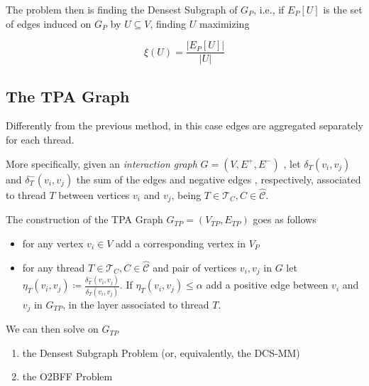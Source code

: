 


The problem then is finding the Densest Subgraph of $G_P$, i.e., if $E_{P} [U]$
is the set of edges induced on $G_P$ by $U \subseteq V$, finding $U$ maximizing

\begin{equation}
	\xi(U) = \frac{|E_{P} [U]|}{|U|}
\end{equation}

\subsection{The \acrlong{TPA} Graph}%
\label{ssub:the_tpa_graph}

Differently from the previous method, in this case edges are aggregated
separately for each thread.

\bigskip

More specifically, given an \emph{interaction graph} $G = (V, E^{+}, E^{-})$ ,
let $\delta_{T}(v_{i}, v_{j})$ and
$\delta^{-} _{T}(v_{i}, v_{j})$ the sum of the edges and negative edges , respectively,
associated to thread $T$ between vertices $v_{i} $ and $v_{j} $, being $T \in
	\mathcal{T}_{C}, C \in \mathcal{\hat{C}}$.

The construction of the \acrfull{TPA} Graph $G_{TP} = (V_{TP}, E_{TP})$ goes as follows

\begin{itemize}
	\item for any vertex $v_{i} \in V$ add a corresponding vertex in $V_{P} $
	\item for any thread $T \in
		      \mathcal{T}_{C}, C \in \mathcal{\hat{C}}$ and pair of vertices
	      $v_i, v_j$ in $G$ let $\eta_{T}(v_i,v_j)
		      \coloneqq \frac{\delta^{-} _{T}(v_i,v_j)}{\delta _{T}(v_i,v_j)} $. If
	      $\eta_{T}(v_i,v_j) \leq \alpha $ add a positive edge between $v_{i} $ and
	      $v_{j} $ in $G_{TP} $, in the layer associated to thread $T$.
\end{itemize}

We can then solve on $G_{TP}$

\begin{enumerate}
	\item the Densest Subgraph Problem (or, equivalently, the
	      \acrshort{DCS}-MM)
	\item the \acrshort{O2BFF} Problem
\end{enumerate}

